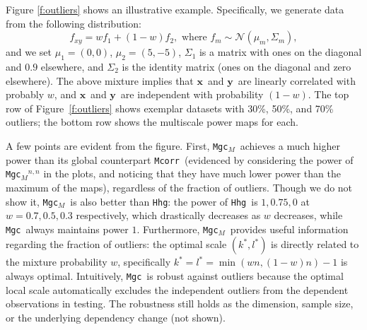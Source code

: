 \documentclass[11pt]{article}
\newcommand{\note}[2][]{\added[#1,remark={#2}]{}}
\providecommand{\sct}[1]{{\sc \texttt{#1}}}
\providecommand{\mb}[1]{\boldsymbol{#1}}
\providecommand{\mc}[1]{\mathcal{#1}}
\newcommand{\T}{^{\ensuremath{\mathsf{T}}}}           %
\newcommand{\Mgc}{\sct{Mgc}}
\newcommand{\Mgcm}{\sct{Mgc$_M$}}
\newcommand{\Hhg}{\sct{Hhg}}
\newcommand{\Mcorr}{\sct{Mcorr}}
\newcommand{\jv}[1]{{\note{jv: #1}}}
\newcommand{\cs}[1]{{\note{cs: #1}}}
\newcommand{\mbx}{\ensuremath{\mb{x}}}
\newcommand{\mby}{\ensuremath{\mb{y}}}
\begin{document}
Figure \ref{f:outliers} shows an illustrative example.  Specifically, we generate data from the following distribution:  
\begin{equation} \label{e:outlier}
f_{xy}=w f_{1}+(1-w) f_{2}, \text{ where } f_{m} \sim \mc{N}(\mu_{m},\Sigma_{m}),
\end{equation}
and we set $\mu_{1}=(0,0)$, $\mu_{2}=(5,-5)$, $\Sigma_{1}$ is a matrix with ones on the diagonal and $0.9$ elsewhere, 
 and $\Sigma_{2}$ is the identity matrix (ones on the diagonal and zero elsewhere). 
 The above mixture implies that \mbx~and \mby~are  linearly correlated with probably $w$, and \mbx~and \mby~are independent with probability $(1-w)$. 
 \cs{deleted: Given $w$, the simulating sample pairs $(X,Y)$ at $n=100$ can be repeatedly generated to estimate the testing powers at $\alpha=0.05$. }
% 
\cs{deleted: For sample data generated from the mixture model, we expect $w \times n$ pairs of observations that are linearly correlated; and the remaining observations are independent outliers. 
Setting $n=100$ and $d_{x}=d_{y}=1$, in }
The top row of Figure~\ref{f:outliers} shows exemplar datasets with 30\%, 50\%, and 70\% outliers; the bottom row shows the multiscale power maps for each.

A few points are evident from the figure.  First, \Mgcm~achieves a much higher power than its global counterpart  \Mcorr~(evidenced by considering the power of \Mgcm$^{n,n}$ in the plots, and noticing that they have much lower power than the maximum of the maps), regardless of the fraction of outliers.\cs{i don't know what we did here.  mgcd vs dcorr, or mgcm vs. mcorr.  please correct. it is mcorr here and next section}  Though we do not show it, \Mgcm~is also better than \Hhg: the power of \Hhg~is $1, 0.75,0$ at $w=0.7,0.5,0.3$ respectively, which drastically decreases as $w$ decreases, while \Mgc~always maintains power $1$. 
Furthermore, \Mgcm~provides useful information regarding the fraction of outliers: the optimal scale $(k^{*},l^{*})$ is directly related to the mixture probability $w$, specifically $k^{*}=l^{*}=\min(wn,(1-w)n)-1$ is always optimal. Intuitively, \Mgc~is robust against outliers because the optimal local scale automatically excludes the independent outliers from the dependent observations in testing. The robustness still holds as the dimension, sample size, or the underlying dependency change (not shown).\jv{cs: is this true? do we have an appendix figure showing it? or have you at least run the simulation?}
\cs{deleted:, which makes \Mgc~more advantageous in practice against noise and outliers. }
\end{document}
